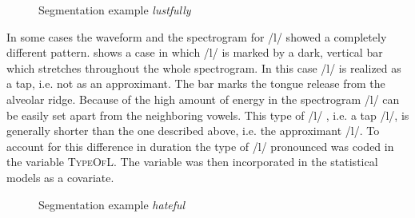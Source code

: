 \begin{figure}  
	
	\caption{Segmentation example \textit{lustfully}}
	\label{fig:segmentation lustfully}
\end{figure}


In some cases the waveform and the spectrogram for /l/ showed a completely different pattern.  shows a case in which /l/ is marked by a dark, vertical bar which stretches throughout the whole spectrogram. In this case /l/ is realized as a tap, i.e. not as an approximant. The bar marks the tongue release from the alveolar ridge. Because of the high amount of energy in the spectrogram /l/ can be easily set apart  from the neighboring vowels. This type of /l/ , i.e. a tap /l/, is generally shorter than the one described above, i.e. the approximant /l/. To account for this difference in duration the type of /l/ pronounced was coded in the variable \textsc{TypeOfL}. The variable was then incorporated in the statistical models as a covariate.\\




\begin{figure} [b!]
	
	\caption{Segmentation example \textit{hateful}}
	\label{fig:segmentation hateful}
\end{figure}

